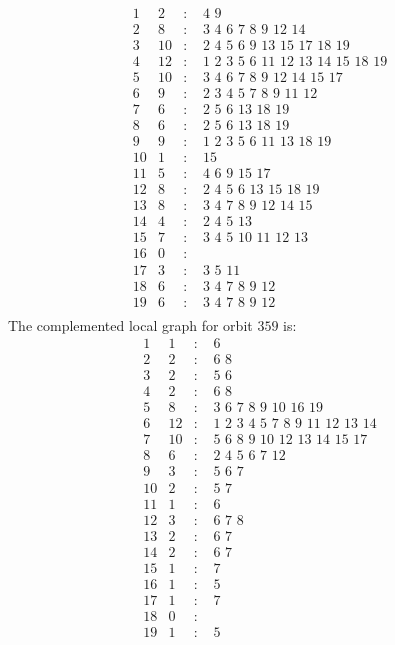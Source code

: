 \documentclass[12pt]{article}
\begin{document}
\begin{equation*}
\begin{array}{rrcl}
1&2&:&\,\,4\,\,9\\
2&8&:&\,\,3\,\,4\,\,6\,\,7\,\,8\,\,9\,\,12\,\,14\\
3&10&:&\,\,2\,\,4\,\,5\,\,6\,\,9\,\,13\,\,15\,\,17\,\,18\,\,19\\
4&12&:&\,\,1\,\,2\,\,3\,\,5\,\,6\,\,11\,\,12\,\,13\,\,14\,\,15\,\,18\,\,19\\
5&10&:&\,\,3\,\,4\,\,6\,\,7\,\,8\,\,9\,\,12\,\,14\,\,15\,\,17\\
6&9&:&\,\,2\,\,3\,\,4\,\,5\,\,7\,\,8\,\,9\,\,11\,\,12\\
7&6&:&\,\,2\,\,5\,\,6\,\,13\,\,18\,\,19\\
8&6&:&\,\,2\,\,5\,\,6\,\,13\,\,18\,\,19\\
9&9&:&\,\,1\,\,2\,\,3\,\,5\,\,6\,\,11\,\,13\,\,18\,\,19\\
10&1&:&\,\,15\\
11&5&:&\,\,4\,\,6\,\,9\,\,15\,\,17\\
12&8&:&\,\,2\,\,4\,\,5\,\,6\,\,13\,\,15\,\,18\,\,19\\
13&8&:&\,\,3\,\,4\,\,7\,\,8\,\,9\,\,12\,\,14\,\,15\\
14&4&:&\,\,2\,\,4\,\,5\,\,13\\
15&7&:&\,\,3\,\,4\,\,5\,\,10\,\,11\,\,12\,\,13\\
16&0&:&\\
17&3&:&\,\,3\,\,5\,\,11\\
18&6&:&\,\,3\,\,4\,\,7\,\,8\,\,9\,\,12\\
19&6&:&\,\,3\,\,4\,\,7\,\,8\,\,9\,\,12\\
\end{array}
\end{equation*}
The complemented local graph for orbit $359$ is:
\begin{equation*}
\begin{array}{rrcl}
1&1&:&\,\,6\\
2&2&:&\,\,6\,\,8\\
3&2&:&\,\,5\,\,6\\
4&2&:&\,\,6\,\,8\\
5&8&:&\,\,3\,\,6\,\,7\,\,8\,\,9\,\,10\,\,16\,\,19\\
6&12&:&\,\,1\,\,2\,\,3\,\,4\,\,5\,\,7\,\,8\,\,9\,\,11\,\,12\,\,13\,\,14\\
7&10&:&\,\,5\,\,6\,\,8\,\,9\,\,10\,\,12\,\,13\,\,14\,\,15\,\,17\\
8&6&:&\,\,2\,\,4\,\,5\,\,6\,\,7\,\,12\\
9&3&:&\,\,5\,\,6\,\,7\\
10&2&:&\,\,5\,\,7\\
11&1&:&\,\,6\\
12&3&:&\,\,6\,\,7\,\,8\\
13&2&:&\,\,6\,\,7\\
14&2&:&\,\,6\,\,7\\
15&1&:&\,\,7\\
16&1&:&\,\,5\\
17&1&:&\,\,7\\
18&0&:&\\
19&1&:&\,\,5\\
\end{array}
\end{equation*}
\end{document}
